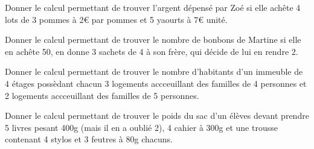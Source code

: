 \begin{multicols}{2}
    
    Donner le calcul permettant de trouver l'argent dépensé par Zoé si elle achête 4 lots de 3 pommes à 2€ par pommes et 5 yaourts à 7€ unité.
    
    
    Donner le calcul permettant de trouver le nombre de bonbons de Martine si elle en achête 50, en donne 3 sachets de 4 à son frère, qui décide de lui en rendre 2.
\end{multicols}

\vspace{-1em}

\begin{multicols}{2}
    
    Donner le calcul permettant de trouver le nombre d'habitants d'un immeuble de 4 étages possèdant chacun 3 logements accceuillant des familles de 4 personnes et 2 logements accceuillant des familles de 5 personnes.
    
    
    Donner le calcul permettant de trouver le poids du sac d'un élèves devant prendre 5 livres pesant 400g (mais il en a oublié 2), 4 cahier à 300g et une trousse contenant 4 stylos et 3 feutres à 80g chacuns.
\end{multicols}